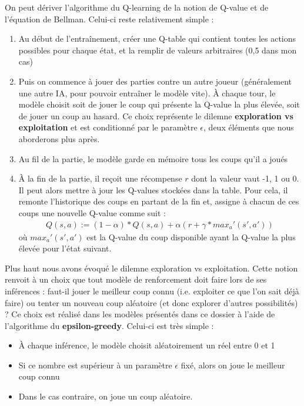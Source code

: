 \documentclass[french]{article}
\begin{document}
    On peut dériver l'algorithme du Q-learning de la notion de Q-value et de l'équation de Bellman. Celui-ci reste relativement simple :
    \begin{enumerate}
        \item Au début de l'entraînement, créer une Q-table qui contient toutes les actions possibles pour chaque état, et la remplir de valeurs arbitraires (0,5 dans mon cas)
        \item Puis on commence à jouer des parties contre un autre joueur (généralement une autre IA, pour pouvoir entraîner le modèle vite). À chaque tour, le modèle choisit soit de jouer le coup qui présente la Q-value la plus élevée, soit de jouer un coup au hasard. Ce choix représente le dilemne \textbf{exploration vs exploitation} et est conditionné par le paramètre $\epsilon$, deux éléments que nous aborderons plus après. 
        \item Au fil de la partie, le modèle garde en mémoire tous les coups qu'il a joués
        \item À la fin de la partie, il reçoit une récompense $r$ dont la valeur vaut -1, 1 ou 0. Il peut alors mettre à jour les Q-values stockées dans la table. Pour cela, il remonte l'historique des coups en partant de la fin et, assigne à chacun de ces coups une nouvelle Q-value comme suit :
        \begin{align*} 
            Q(s,a) := (1-\alpha)*Q(s,a) + \alpha(r + \gamma * max_a'(s',a'))
        \end{align*}
        où $max_a'(s',a')$ est la Q-value du coup disponible ayant la Q-value la plus élevée pour l'état suivant.
        
    \end{enumerate}

    Plus haut nous avons évoqué le dilemne exploration vs exploitation. Cette notion renvoit à un choix que tout modèle de renforcement doit faire lors de ses inférences : faut-il jouer le meilleur coup connu (i.e. exploiter ce que l'on sait déjà faire) ou tenter un nouveau coup aléatoire (et donc explorer d'autres possibilités) ? Ce choix est réalisé dans les modèles présentés dans ce dossier à l'aide de l'algorithme du \textbf{epsilon-greedy}. Celui-ci est très simple :
    \begin{itemize}
        \item À chaque inférence, le modèle choisit aléatoirement un réel entre 0 et 1
        \item Si ce nombre est supérieur à un paramètre $\epsilon$ fixé, alors on joue le meilleur coup connu
        \item Dans le cas contraire, on joue un coup aléatoire.
    \end{itemize}
\end{document}
